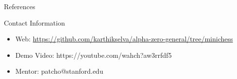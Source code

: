 \documentclass[final]{beamer}
\newlength{\onecolwid}
\begin{document}
\begin{frame}[t]
\begin{columns}[t]
\begin{column}{\onecolwid}
\begin{block}{References}
\end{block}






\begin{alertblock}{Contact Information}

\begin{itemize}
\item Web: \href{https://github.com/karthikselva/alpha-zero-general/tree/minichess}{https://github.com/karthikselva/alpha-zero-general/tree/minichess}
\item Demo Video: https://youtube.com/wahch?aw3rrfdf5
\item Mentor: patcho@stanford.edu
\end{itemize}

\end{alertblock}



\end{column} %

\end{columns} %

\end{frame} %
\end{document}
